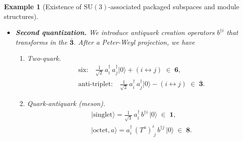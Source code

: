 \documentclass[12pt,a4paper]{article}
\newtheorem{example}{Example}
\begin{document}
\begin{example}[Existence of $\mathrm{SU}(3)$-associated packaged subspaces and module structures]
\begin{enumerate}
\begin{itemize}
\begin{enumerate}
				The two-quark product wave function			
				$
				\Psi_{ij}(\mathbf x_1,s_1;\mathbf x_2,s_2)
				=\psi_i(\mathbf x_1,s_1)\,\psi_j(\mathbf x_2,s_2)
				$
				decomposes into
				\begin{enumerate}
					\item symmetric $\mathbf6$:				
					$$
					\Psi^{(6)}_{(ij)}=\frac1{\sqrt2}\bigl[\Psi_{ij}+\Psi_{ji}\bigr],  
					$$
					
					\item antisymmetric $\overline{\mathbf3}$:				
					$$
					\Psi^{(\overline3)}_{[ij]}=\frac1{\sqrt2}\bigl[\Psi_{ij}-\Psi_{ji}\bigr].
					$$
				\end{enumerate}
				
				\item Quark-antiquark (meson): $\mathbf3\otimes\overline{\mathbf3}=\mathbf1\oplus\mathbf8$
				
				The quark-antiquark product wave function
				$
				\Phi_i{}^j(\mathbf x,\mathbf y;s,s')
				=\psi_i(\mathbf x,s)\,\phi^j(\mathbf y,s')
				$	
				decomposes into
				\begin{enumerate}
					\item singlet $\mathbf1$:				
					$$
					\Phi^{(1)}=\frac1{\sqrt3}\,\delta^{\,i}_{j}\,\Phi_i{}^j,
					$$
					
					\item octet $\mathbf8$:				
					$$
					\Phi^{(8)a}
					=\sqrt2\,\Phi_i{}^j\,(T^a)^i_{\;j},\quad a=1,\dots,8.
					$$
				\end{enumerate}
			\end{enumerate}
			
			
			\item \textbf{Second quantization.}			
			We introduce antiquark creation operators $b^{\dagger i}$ that transforms in the $\overline{\mathbf3}$.
			After a Peter-Weyl projection, we have
			\begin{enumerate}
				\item Two-quark.
				$$
				\begin{aligned}
					&\text{six:}\quad
					\frac1{\sqrt2}\,a_i^\dagger\,a_j^\dagger\bigl|0\bigr\rangle
					+
					(i\leftrightarrow j)
					\;\in\;\mathbf6,\\
					&\text{anti-triplet:}\quad
					\frac1{\sqrt2}\,a_i^\dagger\,a_j^\dagger\bigl|0\bigr\rangle
					-
					(i\leftrightarrow j)
					\;\in\;\overline{\mathbf3}.
				\end{aligned}
				$$
				
				\item Quark-antiquark (meson).	
				$$
				\begin{aligned}
					&|\text{singlet}\rangle
					=\frac1{\sqrt3}\,a_i^\dagger\,b^{\dagger i}\,\lvert0\rangle
					\;\in\;\mathbf1,\\
					&|\text{octet},a\rangle
					=a_i^\dagger\,(T^a)^i_{\;j}\,b^{\dagger j}\,\lvert0\rangle
					\;\in\;\mathbf8.
				\end{aligned}
				$$
			\end{enumerate}
		\end{itemize}
			

\end{enumerate}
\end{example}
\end{document}
